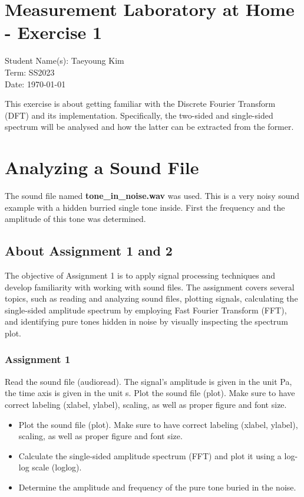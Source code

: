 \documentclass[
	a4paper,
	11pt,
]{article}
\begin{document}
\fancyhf{} %

\section*{Measurement Laboratory at Home - Exercise 1}
Student Name(s): Taeyoung Kim\\
Term: SS2023 \\
Date: \today

This exercise is about getting familiar with the Discrete Fourier Transform (DFT) and its implementation. Specifically, the two-sided and single-sided spectrum will be analysed and how the latter can be extracted from the former.

\section{Analyzing a Sound File}
The sound file named \textbf{tone\_in\_noise.wav} was used. This is a very noisy sound example with a hidden burried single tone inside. First  the frequency and the amplitude of this tone was determined.

\subsection{About Assignment 1 and 2}
The objective of Assignment 1 is to apply signal processing techniques and develop familiarity with working with sound files. The assignment covers several topics, such as reading and analyzing sound files, plotting signals, calculating the single-sided amplitude spectrum by employing Fast Fourier Transform (FFT), and identifying pure tones hidden in noise by visually inspecting the spectrum plot.

\subsubsection{Assignment 1}
Read the sound file (audioread). The signal’s amplitude is given in the unit Pa, the time axis is given
in the unit s. Plot the sound file (plot). Make sure to have correct labeling (xlabel, ylabel), scaling, as well as
proper figure and font size.\\

\begin{itemize}
\item Plot the sound file (plot). Make sure to have correct labeling (xlabel, ylabel), scaling, as well as
proper figure and font size.
\item Calculate the single-sided amplitude spectrum (FFT) and plot it using a log-log scale (loglog).
\item  Determine the amplitude and frequency of the pure tone buried in the noise.
\end{itemize}
\end{document}
